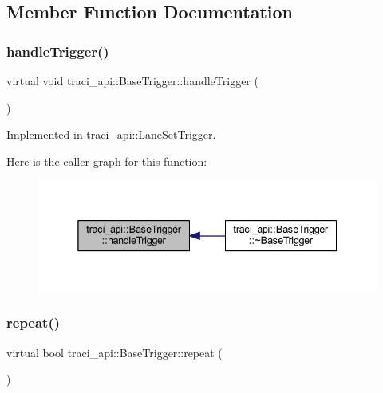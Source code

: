 \subsection{Member Function Documentation}
\mbox{\label{classtraci__api_1_1_base_trigger_a2de2824fb1d228d4c04aa15c272017a5}} 
\subsubsection{\texorpdfstring{handle\+Trigger()}{handleTrigger()}}
{\footnotesize\ttfamily virtual void traci\+\_\+api\+::\+Base\+Trigger\+::handle\+Trigger (\begin{DoxyParamCaption}{ }\end{DoxyParamCaption})\hspace{0.3cm}{\ttfamily [pure virtual]}}



Implemented in \hyperlink{classtraci__api_1_1_lane_set_trigger_a9bc702339daf8aa0d905e3bab5ff2dc3}{traci\+\_\+api\+::\+Lane\+Set\+Trigger}.

Here is the caller graph for this function\+:
\nopagebreak
\begin{figure}[H]
\begin{center}
\leavevmode
\includegraphics[width=338pt]{classtraci__api_1_1_base_trigger_a2de2824fb1d228d4c04aa15c272017a5_icgraph}
\end{center}
\end{figure}
\mbox{\label{classtraci__api_1_1_base_trigger_a7d2b1ac3f54e42e71eae69f1c7f33943}} 
\subsubsection{\texorpdfstring{repeat()}{repeat()}}
{\footnotesize\ttfamily virtual bool traci\+\_\+api\+::\+Base\+Trigger\+::repeat (\begin{DoxyParamCaption}{ }\end{DoxyParamCaption})\hspace{0.3cm}{\ttfamily [pure virtual]}}



